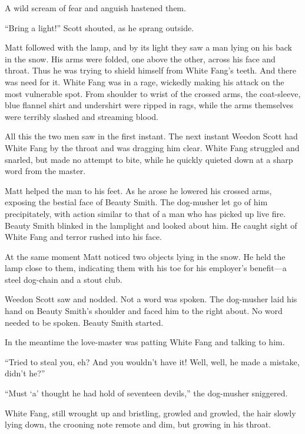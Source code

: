 \documentclass[10pt]{book}
\begin{document}
A wild scream of fear and anguish hastened them.

“Bring a light!” Scott shouted, as he sprang outside.

Matt followed with the lamp, and by its light they saw a man lying on
his back in the snow. His arms were folded, one above the other, across
his face and throat. Thus he was trying to shield himself from White
Fang’s teeth. And there was need for it. White Fang was in a rage,
wickedly making his attack on the most vulnerable spot. From shoulder
to wrist of the crossed arms, the coat-sleeve, blue flannel shirt and
undershirt were ripped in rags, while the arms themselves were terribly
slashed and streaming blood.

All this the two men saw in the first instant. The next instant Weedon
Scott had White Fang by the throat and was dragging him clear. White
Fang struggled and snarled, but made no attempt to bite, while he
quickly quieted down at a sharp word from the master.

Matt helped the man to his feet. As he arose he lowered his crossed
arms, exposing the bestial face of Beauty Smith. The dog-musher let go
of him precipitately, with action similar to that of a man who has
picked up live fire. Beauty Smith blinked in the lamplight and looked
about him. He caught sight of White Fang and terror rushed into his
face.

At the same moment Matt noticed two objects lying in the snow. He held
the lamp close to them, indicating them with his toe for his employer’s
benefit—a steel dog-chain and a stout club.

Weedon Scott saw and nodded. Not a word was spoken. The dog-musher laid
his hand on Beauty Smith’s shoulder and faced him to the right about.
No word needed to be spoken. Beauty Smith started.

In the meantime the love-master was patting White Fang and talking to
him.

“Tried to steal you, eh? And you wouldn’t have it! Well, well, he made
a mistake, didn’t he?”

“Must ‘a’ thought he had hold of seventeen devils,” the dog-musher
sniggered.

White Fang, still wrought up and bristling, growled and growled, the
hair slowly lying down, the crooning note remote and dim, but growing
in his throat.

\end{document}
